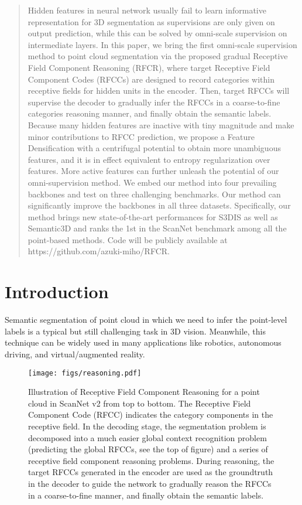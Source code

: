 \documentclass[final]{cvpr}
\begin{document}
\begin{abstract}
   Hidden features in neural network usually fail to learn informative representation for 3D segmentation as supervisions are only given on output prediction, while this can be solved by omni-scale supervision on intermediate layers. In this paper, we bring the first omni-scale supervision method to point cloud segmentation via the proposed gradual Receptive Field Component Reasoning (RFCR), where target Receptive Field Component Codes (RFCCs) are designed to record categories within receptive fields for hidden units in the encoder. Then, target RFCCs will supervise the decoder to gradually infer the RFCCs in a coarse-to-fine categories reasoning manner, and finally obtain the semantic labels. Because many hidden features are inactive with tiny magnitude and make minor contributions to RFCC prediction, we propose a Feature Densification with a centrifugal potential to obtain more unambiguous features, and it is in effect equivalent to entropy regularization over features. More active features can further unleash the potential of our omni-supervision method. 
   We embed our method into four prevailing backbones and test on three challenging benchmarks. Our method can significantly improve the backbones in all three datasets. Specifically, our method brings new state-of-the-art performances for S3DIS as well as Semantic3D and ranks the 1st in the ScanNet benchmark among all the point-based methods. 
   Code will be publicly available at https://github.com/azuki-miho/RFCR. 

\end{abstract}

\section{Introduction}
Semantic segmentation of point cloud in which we need to infer the point-level labels is a typical but still challenging task in 3D vision. Meanwhile, this technique can be widely used in many applications like robotics, autonomous driving, and virtual/augmented reality.


\begin{figure}
    \centering
    \texttt{[image: figs/reasoning.pdf]}
    \caption{Illustration of Receptive Field Component Reasoning for a point cloud in ScanNet v2 from top to bottom. The Receptive Field Component Code (RFCC) indicates the category components in the receptive field. In the decoding stage, the segmentation problem is decomposed into a much easier global context recognition problem (predicting the global RFCCs, see the top of figure) and a series of receptive field component reasoning problems. During reasoning, the target RFCCs generated in the encoder are used as the groundtruth in the decoder to guide the network to gradually reason the RFCCs in a coarse-to-fine manner, and finally obtain the semantic labels.
}
    \label{fig:reasoning}
\end{figure}
\end{document}
